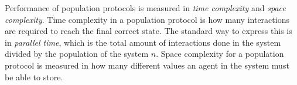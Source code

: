 Performance of population protocols is measured in \emph{time complexity} and \emph{space complexity}. Time complexity in a population protocol is how many interactions are required to reach the final correct state. The standard way to express this is in \emph{parallel time}, which is the total amount of interactions done in the system divided by the population of the system $n$. Space complexity for a population protocol is measured in how many different values an agent in the system must be able to store. 

